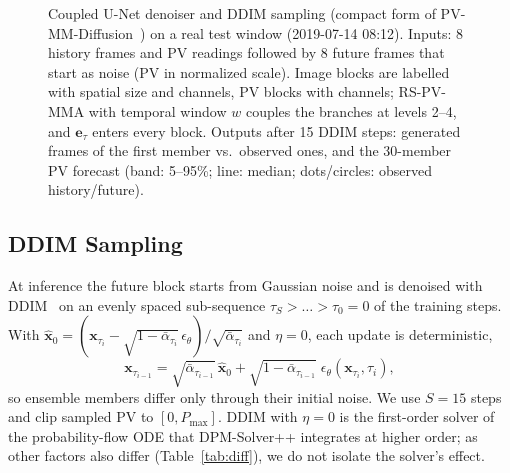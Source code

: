 \documentclass[conference]{IEEEtran}
\begin{document}
\begin{figure}[t]
\caption{Coupled U-Net denoiser and DDIM sampling (compact form of PV-MM-Diffusion~\cite{huang2026pvmm}) on a real
test window (2019-07-14 08:12). Inputs: 8 history frames and PV readings followed by 8 future frames that start as
noise (PV in normalized scale). Image blocks are labelled with spatial size and channels, PV blocks with channels;
RS-PV-MMA with temporal window $w$ couples the branches at levels 2--4, and $\mathbf{e}_\tau$ enters every block.
Outputs after 15 DDIM steps: generated frames of the first member vs.\ observed ones, and the 30-member PV forecast
(band: 5--95\%; line: median; dots/circles: observed history/future).}
\label{fig:arch}
\end{figure}

\subsection{DDIM Sampling}
At inference the future block starts from Gaussian noise and is denoised with DDIM~\cite{song2021ddim} on an evenly
spaced sub-sequence $\tau_S>\dots>\tau_0=0$ of the training steps. With
$\hat{\mathbf{x}}_0=(\mathbf{x}_{\tau_i}-\sqrt{1-\bar\alpha_{\tau_i}}\,\epsilon_\theta)/\sqrt{\bar\alpha_{\tau_i}}$
and $\eta=0$, each update is deterministic,
\begin{equation}
  \mathbf{x}_{\tau_{i-1}}=\sqrt{\bar\alpha_{\tau_{i-1}}}\,\hat{\mathbf{x}}_0
  +\sqrt{1-\bar\alpha_{\tau_{i-1}}}\;\epsilon_\theta(\mathbf{x}_{\tau_i},\tau_i),
\end{equation}
so ensemble members differ only through their initial noise. We use $S=15$ steps and clip sampled PV to
$[0,P_{\max}]$. DDIM with $\eta=0$ is the first-order solver of the probability-flow ODE that DPM-Solver++ integrates
at higher order; as other factors also differ (Table~\ref{tab:diff}), we do not isolate the solver's effect.
\end{document}
